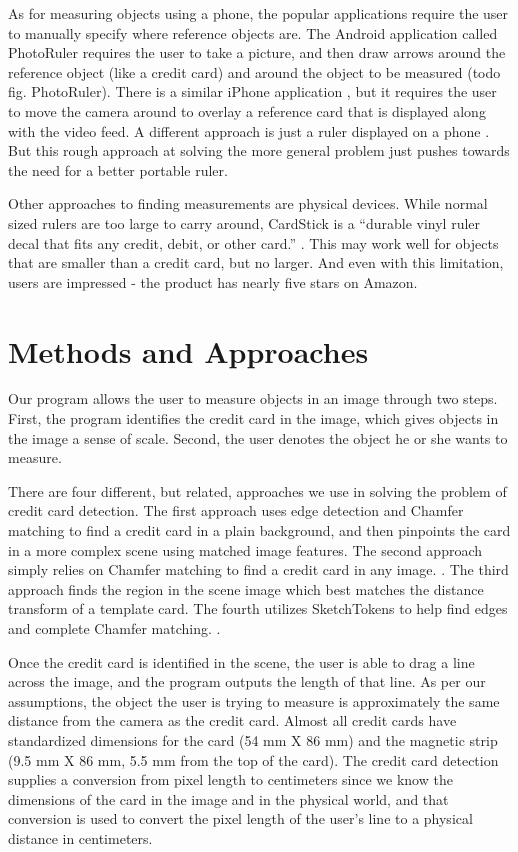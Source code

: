 \documentclass[10pt,twocolumn,letterpaper]{article}
\begin{document}
As for measuring objects using a phone, the popular applications require the user to manually specify where reference objects are. The Android application called PhotoRuler \cite{PhotoRuler} requires the user to take a picture, and then draw arrows around the reference object (like a credit card) and around the object to be measured (todo fig. PhotoRuler). There is a similar iPhone application \cite{RulerPhone}, but it requires the user to move the camera around to overlay a reference card that is displayed along with the video feed. A different approach is just a ruler displayed on a phone \cite{SmartRuler}. But this rough approach at solving the more general problem just pushes towards the need for a better portable ruler.

Other approaches to finding measurements are physical devices. While normal sized rulers are too large to carry around, CardStick is a “durable vinyl ruler decal that fits any credit, debit, or other card.” \cite{CardStick}. This may work well for objects that are smaller than a credit card, but no larger. And even with this limitation, users are impressed - the product has nearly five stars on Amazon.

\section{Methods and Approaches}

Our program allows the user to measure objects in an image through two steps. First, the program identifies the credit card in the image, which gives objects in the image a sense of scale. Second, the user denotes the object he or she wants to measure. 

There are four different, but related, approaches we use in solving the problem of credit card detection. The first approach uses edge detection and Chamfer matching to find a credit card in a plain background, and then pinpoints the card in a more complex scene using matched image features. The second approach simply relies on Chamfer matching to find a credit card in any image. \cite{chamfer}. The third approach finds the region in the scene image which best matches the distance transform of a template card. The fourth utilizes SketchTokens to help find edges and complete Chamfer matching. \cite{SketchTokens}. 

Once the credit card is identified in the scene, the user is able to drag a line across the image, and the program outputs the length of that line. As per our assumptions, the object the user is trying to measure is approximately the same distance from the camera as the credit card. Almost all credit cards have standardized dimensions for the card (54 mm X 86 mm) and the magnetic strip (9.5 mm X 86 mm, 5.5 mm from the top of the card). The credit card detection supplies a conversion from pixel length to centimeters since we know the dimensions of the card in the image and in the physical world, and that conversion is used to convert the pixel length of the user’s line to a physical distance in centimeters. 
\end{document}
